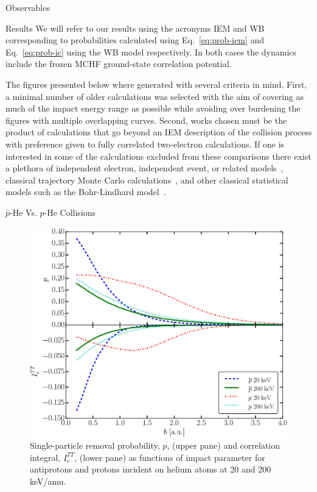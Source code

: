 \documentclass[letterpaper, 11 pt]{report}
\begin{document}
\begin{chapter}{Observables \label{chap:p-he2p-he}}
\begin{section}{Results \label{sec:phe2p-res}}
      We will refer to our results using the acronyms IEM and WB corresponding to probabilities
      calculated using Eq.~\eqref{eq:prob-iem} and Eq.~\eqref{eq:prob-ic} using the WB model
      respectively. In both cases the dynamics include the frozen MCHF ground-state correlation
      potential.

      The figures presented below where generated with several criteria in mind. First, a minimal number
      of older calculations was selected with the aim of covering as much of the impact energy range as
      possible while avoiding over burdening the figures with multiple overlapping curves. Second, works
      chosen must be the product of calculations that go beyond an IEM description of the collision
      process with preference given to fully correlated two-electron calculations. If one is interested
      in some of the calculations excluded from these comparisons there exist a plethora of independent
      electron, independent event, or related models~\cite{SLD-83, DMR-84, SLD-85, GM-86, CM-87, GM-87,
      JLF-89, DC-90, DC-91a, DC-91b, DG-91, SKG-91, SL-91, Kuang-92, MLC-93, CM-94, CSR-95, BDM-96,
      MBGH-97, McCartney-97, Mccartney-99, GAMRF-02, GFS-02, AMRF-04, BLMC-04, FRBJG-06, FJG-07,
      GIFK-08, ZK-09, G-11, LFG-11, GG-12}, classical trajectory Monte Carlo calculations~\cite{ZM-85,
      OWM-86, MO-87, WO-88, MS-89, Cohen-96, TH-96, MMTH-02, DAKW-04, GEP-09}, and other classical
      statistical models such as the Bohr-Lindhard model~\cite{DYC-08,Ding-12}. 

      \begin{subsection}{ \texorpdfstring{$\bar{p}$}{pbar}-He Vs. \texorpdfstring{$p$}{p}-He Collisions
                         \label{sec:pbarhe-res}}

         \begin{figure}[htp]
            \centering
            \includegraphics[width = 0.49\linewidth]{./images/p-ic.eps}
            \caption[Single-particle removal and correlation integral]
                    {Single-particle removal probability, $p$, (upper pane) and
                     correlation integral, $I_\mathrm{c}^{TT}$, (lower pane) as functions of impact
                     parameter for antiprotons and protons incident on helium atoms at 20 and
                     200 keV/amu. \label{fig:p-ic}}
         \end{figure}


\end{subsection}
\end{section}
\end{chapter}
\end{document}
